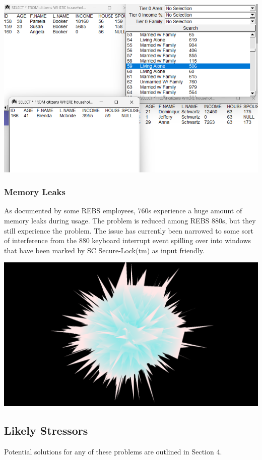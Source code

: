 \documentclass{article}
\begin{document}
\begin{multicols}{2}
\begin{center}
\includegraphics[scale=0.3]{database.png}
\end{center}

\subsubsection{Memory Leaks}
As documented by some REBS employees, 760s experience a huge amount of memory leaks during usage. The problem is reduced among REBS 880s, but they still experience the problem. The issue has currently been narrowed to some sort of interference from the 880 keyboard interrupt event spilling over into windows that have been marked by SC Secure-Lock(tm) as input friendly.

\begin{center}
\includegraphics[scale=0.1]{AH49CI.png}
\end{center}

\subsection{Likely Stressors}
Potential solutions for any of these problems are outlined in Section 4. 


\end{multicols}
\end{document}
